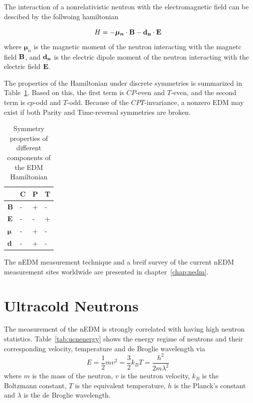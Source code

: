 The interaction of a nonrelativistic neutron with
the electromagnetic field can be descibed by the follwoing
hamiltonian

\begin{equation}
  \label{eqn:hamiltonian}
 H= -\boldsymbol{\mu_n} \cdot \bf{B} - \bf{d}_n \cdot \bf{E}
 \end{equation}
where $\boldsymbol{\mu}_n$ is the magnetic moment of the neutron
interacting with the magnetc field $\bf{B}$, and $\bf{d}_n$ is
the electric dipole moment of the neutron interacting with the
electric field $\bf{E}$.

The properties of the Hamiltonian under discrete symmetries is
summarized in Table~\ref{tab:Hsymmetry}. Based on this, the first term
is $CP$-even and $T$-even, and the second term is $cp$-odd and
$T$-odd. Because of the $CPT$-invariance, a nonzero EDM may exist if
both Parity and Time-reversal symmetries are broken.


\begin{table}[h!]
  \label{tab:Hsymmetry}
\begin{center}
\begin{tabular}{| l | l | l | l |} 
\hline
 & C & P & T \\ \hline
\textbf{B} & - &+ &- \\ \hline
\textbf{E} & -&- &+ \\ \hline
$\boldsymbol{\mu}$ &- &+ &- \\ \hline 
\textbf{d} & -&+ &- \\ \hline
\end{tabular}
\caption{Symmetry properties of different components of the EDM
  Hamiltonian}
\end{center}
\end{table}
  
The nEDM measurement technique and a breif survey of the current nEDM
measurement sites worldwide are presented in chapter~\ref{chap:nedm}.






\section{Ultracold Neutrons}
The measurement of the nEDM is strongly correlated with having high
neutron statistics. Table~\ref{tab:ucnenergy} shows the energy regime
of neutrons and their corresponding velocity, temperature and de
Broglie wavelength via
\begin{equation}
  \label{eqn:ucnenergy}
  E = \frac{1}{2} m v^2 = \frac{3}{2} k_B T = \frac{h^2}{2m \lambda^2}
\end{equation}
where $m$ is the mass of the neutron, $v$ is the neutron velocity,
$k_B$ is the Boltzmann constant, $T$ is the equivalent temperature,
$h$ is the Planck's constant and $\lambda$ is the de Broglie
wavelength.

